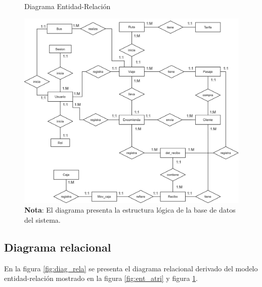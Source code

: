 	\begin{figure}[!h] %
		\caption[Diagrama Entidad-Relación ]
		{\newline Diagrama Entidad-Relación} %
		\vspace{0.3cm}
		\centering
		\includegraphics[width=1\textwidth]{imagenes/cap_3/MER_cali.drawio_completo.png} %
		\vspace{-0.1cm}
			\caption*{\textup{\textbf{Nota}: El diagrama presenta la estructura lógica de la base de datos del sistema.}}	
		\vspace{-0.6cm}
		\label{fig:MER_com} %
	\end{figure}
	
	\subsection{Diagrama relacional}
	En la figura \ref{fig:diag_rela} se presenta el diagrama relacional derivado del modelo entidad-relación mostrado en la figura \ref{fig:ent_atri} y figura \ref{fig:MER_com}.
	
	\vspace{0.3cm} %
	

